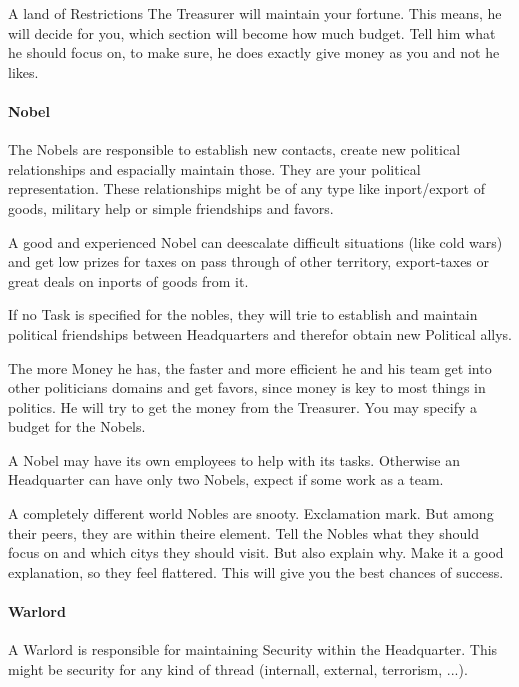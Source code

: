 \documentclass[10pt,twoside,twocolumn,openany]{book}
\begin{document}
\begin{paperbox}{A land of Restrictions}
The Treasurer will maintain your fortune. This means, he will decide for you, which section will become how much budget. Tell him what he should focus on, to make sure, he does exactly give money as you and not he likes.
\end{paperbox}

\paragraph{Nobel}

The Nobels are responsible to establish new contacts, create new political relationships and espacially maintain those. They are your political representation. These relationships might be of any type like inport/export of goods, military help or simple friendships and favors.

A good and experienced Nobel can deescalate difficult situations (like cold wars) and get low prizes for taxes on pass through of other territory, export-taxes or great deals on inports of goods from it.

If no Task is specified for the nobles, they will trie to establish and maintain political friendships between Headquarters and therefor obtain new Political allys.

The more Money he has, the faster and more efficient he and his team get into other politicians domains and get favors, since money is key to most things in politics. He will try to get the money from the Treasurer. You may specify a budget for the Nobels.

A Nobel may have its own employees to help with its tasks. Otherwise an Headquarter can have only two Nobels, expect if some work as a team.

\begin{paperbox}{A completely different world}
Nobles are snooty. Exclamation mark. But among their peers, they are within theire element. Tell the Nobles what they should focus on and which citys they should visit. But also explain why. Make it a good explanation, so they feel flattered. This will give you the best chances of success.
\end{paperbox}

\paragraph{Warlord}

A Warlord is responsible for maintaining Security within the Headquarter. This might be security for any kind of thread (internall, external, terrorism, ...).
\end{document}
